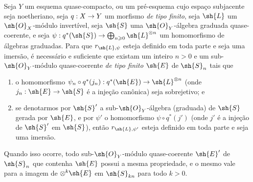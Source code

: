 \documentclass[oneside,10pt]{amsart}
\makeatletter
\renewcommand{\geq}{\geqslant}
\newcommand{\ega@arrow}[2]{\mathchoice{#1}{#2}{#2}{#2}}
\renewcommand{\to}{\ega@arrow{\longrightarrow}{\rightarrow}}
\let\EGAOriginalLabel\label
\renewcommand{\label}[1]{\phantomsection\EGAOriginalLabel{#1}}
\makeatother
\begin{document}
\begin{proposition}[3.8.5]
\label{II.3.8.5}
Seja $Y$ um esquema quase-compacto, ou um pré-esquema cujo espaço subjacente seja noetheriano, seja $q:X\to Y$ um morfismo \emph{de tipo finito}, seja $\sh{L}$ um $\sh{O}_X$-módulo invertível, seja $\sh{S}$ uma $\sh{O}_Y$-álgebra graduada quase-coerente, e seja $\psi:q^*(\sh{S})\to\bigoplus_{n\geq0}\sh{L}^{\otimes n}$ um homomorfismo de álgebras graduadas.
Para que $r_{\sh{L},\psi}$ esteja definido em toda parte e seja uma imersão, é necessário e suficiente que existam um inteiro $n>0$ e um sub-$\sh{O}_Y$-módulo quase-coerente \emph{de tipo finito} $\sh{E}$ de $\sh{S}_n$ tais que
\begin{enumerate}
  \item[a)] o homomorfismo $\psi_n\circ q^*(j_n):q^*(\sh{E})\to\sh{L}^{\otimes n}$ (onde $j_n:\sh{E}\to\sh{S}$ é a injeção canônica) seja sobrejetivo; e
  \item[b)] se denotarmos por $\sh{S}'$ a sub-$\sh{O}_Y$-álgebra (graduada) de $\sh{S}$ gerada por $\sh{E}$, e por $\psi'$ o homomorfismo $\psi\circ q^*(j')$ (onde $j'$ é a injeção de $\sh{S}'$ em $\sh{S}$), então $r_{\sh{L},\psi'}$ esteja definido em toda parte e seja uma imersão.
\end{enumerate}

Quando isso ocorre, todo sub-$\sh{O}_Y$-módulo quase-coerente $\sh{E}'$ de $\sh{S}_n$ que contenha $\sh{E}$ possui a mesma propriedade, e o mesmo vale para a imagem de $\otimes^k\sh{E}$ em $\sh{S}_{kn}$ para todo $k>0$.
\end{proposition}
\end{document}
